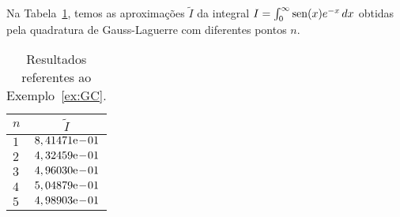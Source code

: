 
\begin{ex}\label{ex:GLa}
  Na Tabela~\ref{tab:ex_GLa}, temos as aproximações $\tilde{I}$ da integral $I = \int_0^\infty \operatorname{sen}(x)e^{-x}\,dx$ obtidas pela quadratura de Gauss-Laguerre com diferentes pontos $n$.

\begin{table}[h!]
  \centering
  \begin{tabular}{lc}
    $n$ & $\tilde{I}$\\\hline
    $1$ & $8,41471\mathrm{e}\!-\!01$ \\
    $2$ & $4,32459\mathrm{e}\!-\!01$ \\
    $3$ & $4,96030\mathrm{e}\!-\!01$ \\
    $4$ & $5,04879\mathrm{e}\!-\!01$ \\
    $5$ & $4,98903\mathrm{e}\!-\!01$ \\\hline
  \end{tabular}
  \caption{Resultados referentes ao Exemplo~\ref{ex:GC}.}
  \label{tab:ex_GLa}
\end{table}






\end{ex}

